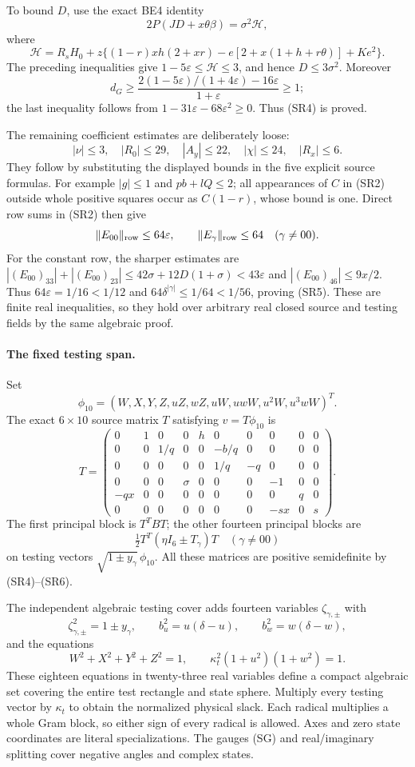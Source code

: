 To bound $D$, use the exact BE4 identity
\[
 2P(JD+x\theta\beta)=\sigma^2\mathcal H,
\]
where
\[
\mathcal H=R_sH_0+z\{(1-r)xh(2+xr)
       -e[2+x(1+h+r\theta)]+Ke^2\}.
\]
The preceding inequalities give $1-5\varepsilon\le\mathcal H\le3$,
and hence $D\le3\sigma^2$. Moreover
\[
 d_G\ge
 \frac{2(1-5\varepsilon)/(1+4\varepsilon)-16\varepsilon}
      {1+\varepsilon}\ge1;
\]
the last inequality follows from
$1-31\varepsilon-68\varepsilon^2\ge0$. Thus (SR4) is proved.

The remaining coefficient estimates are deliberately loose:
\[
 |\nu|\le3,\quad |R_0|\le29,\quad |A_y|\le22,
 \quad|\chi|\le24,\quad |R_x|\le6.
\]
They follow by substituting the displayed bounds in the five explicit
source formulas. For example $|g|\le1$ and
$pb+lQ\le2$; all appearances of $C$ in (SR2) outside whole
positive squares occur as $C(1-r)$, whose bound is one.
Direct row sums in (SR2) then give
\[
 \|E_{00}\|_{\rm row}\le64\varepsilon,\qquad
 \|E_\gamma\|_{\rm row}\le64\quad(\gamma\ne00).
\]
For the constant row, the sharper estimates are
$|(E_{00})_{33}|+|(E_{00})_{23}|\le
42\sigma+12D(1+\sigma)<43\varepsilon$ and
$|(E_{00})_{46}|\le9x/2$.
Thus $64\varepsilon=1/16<1/12$ and
$64\delta^{|\gamma|}\le1/64<1/56$, proving (SR5).
These are finite real inequalities, so they hold over arbitrary
real closed source and testing fields by the same algebraic proof.

\paragraph{The fixed testing span.}
Set
\[
 \phi_{10}=(W,X,Y,Z,uZ,wZ,uW,uwW,u^2W,u^3wW)^T.
\]
The exact $6\times10$ source matrix $T$ satisfying $v=T\phi_{10}$ is
\[
T=\begin{pmatrix}
0&1&0&0&h&0&0&0&0&0\\
0&0&1/q&0&0&-b/q&0&0&0&0\\
0&0&0&0&0&1/q&-q&0&0&0\\
0&0&0&\sigma&0&0&0&-1&0&0\\
-qx&0&0&0&0&0&0&0&q&0\\
0&0&0&0&0&0&0&-sx&0&s
\end{pmatrix}.
\]
The first principal block is $T^TBT$; the other fourteen principal
blocks are
\[
 \tfrac12T^T(\eta I_6\pm T_\gamma)T
 \quad(\gamma\ne00)
\]
on testing vectors $\sqrt{1\pm y_\gamma}\,\phi_{10}$.
All these matrices are positive semidefinite by (SR4)--(SR6).

The independent algebraic testing cover adds fourteen variables
$\zeta_{\gamma,\pm}$ with
\[
 \zeta_{\gamma,\pm}^2=1\pm y_\gamma,\qquad
 b_u^2=u(\delta-u),\qquad b_w^2=w(\delta-w),
\]
and the equations
\[
 W^2+X^2+Y^2+Z^2=1,\qquad
 \kappa_t^2(1+u^2)(1+w^2)=1 .
\]
These eighteen equations in twenty-three real variables define a
compact algebraic set covering the entire test rectangle and state
sphere. Multiply every testing vector by $\kappa_t$ to obtain the
normalized physical slack. Each radical multiplies a whole Gram
block, so either sign of every radical is allowed. Axes and zero
state coordinates are literal specializations. The gauges (SG)
and real/imaginary splitting cover negative angles and complex states.

